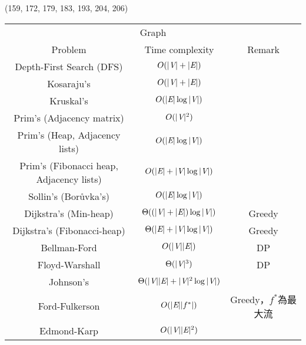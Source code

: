 \item \begin{theorem}{(159, 172, 179, 183, 193, 204, 206)} \quad\quad
    \begin{table}[H]
        \centering
        \begin{tabular}{|c|c|c|}
            \hline
            \multicolumn{3}{|c|}{Graph} \\
            \Xhline{3\arrayrulewidth}
            Problem & Time complexity & Remark \\
            \Xhline{2\arrayrulewidth}
            Depth-First Search (DFS) & $O(|\textit{V}| + |\textit{E}|)$ & \\
            \hline
            Kosaraju's & $O(|\textit{V}| + |\textit{E}|)$ & \\
            \hline
            Kruskal's & $O(|\textit{E}|\log |\textit{V}|)$ & \\
            \hline
            Prim's (Adjacency matrix) & $O(|\textit{V}|^2)$ & \\
            \hline
            Prim's (Heap, Adjacency lists) & $O(|\textit{E}|\log |\textit{V}|)$ & \\
            \hline
            Prim's (Fibonacci heap, Adjacency lists) & $O(|\textit{E}| + |\textit{V}|\log |\textit{V}|)$ & \\
            \hline
            Sollin's (Borůvka's) & $O(|\textit{E}|\log |\textit{V}|)$ & \\
            \hline
            Dijkstra's (Min-heap) & $\Theta((|\textit{V}| + |\textit{E}|)\log |\textit{V}|)$ & Greedy \\
            \hline
            Dijkstra's (Fibonacci-heap) & $\Theta(|\textit{E}| + |\textit{V}|\log|\textit{V}|)$ & Greedy \\
            \hline
            Bellman-Ford & $O(|\textit{V}||\textit{E}|)$ & DP \\
            \hline
            Floyd-Warshall & $\Theta(|\textit{V}|^3)$ & DP \\
            \hline
            Johnson's & $\Theta(|\textit{V}||\textit{E}| + |\textit{V}|^2\log |\textit{V}|)$ & \\
            \hline
            Ford-Fulkerson & $O(|\textit{E}||f^*|)$ & Greedy，$f^*$為最大流 \\
            \hline
            Edmond-Karp & $O(|\textit{V}||\textit{E}|^2)$ & \\
            \hline
        \end{tabular}
    \end{table}
\end{theorem}

